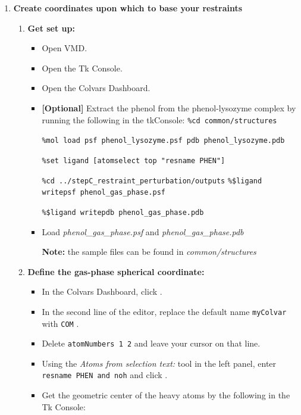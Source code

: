 \documentclass[9pt,tutorial]{Styling/livecoms}
\newcommand{\tkconsole}[1]{\texttt{\%#1}}
\newcommand{\filepath}[1]{\textit{#1}}
\newcommand{\button}[1]{
  \inlineBox[gray]{\texttt{#1}}
}
\newcommand{\menu}[1]{
  \textit{#1}
}
\newcommand{\textInput}[1]{
  \texttt{#1}
}
\begin{document}
    \begin{enumerate}[label=\arabic*.]
    
        \item \textbf{Create coordinates upon which to base your restraints}
        \begin{enumerate}[label=\alph*., ref=\theenumi.\alph*]
            \item \textbf{Get set up:}
            \begin{itemize}
                \item Open VMD.
                \item Open the Tk Console.
                \item Open the Colvars Dashboard.
                
            \item \textbf{[Optional]} Extract the phenol from the phenol-lysozyme complex by running the following in the tkConsole:
                \tkconsole{cd common/structures}
                
                \tkconsole{mol load psf phenol\_lysozyme.psf pdb phenol\_lysozyme.pdb}
                
                \tkconsole{set ligand [atomselect top "resname PHEN"]}
                
                \tkconsole{cd ../stepC\_restraint\_perturbation/outputs}
                \tkconsole{\$ligand writepsf phenol\_gas\_phase.psf}
                
                \tkconsole{\$ligand writepdb phenol\_gas\_phase.pdb}

                \item Load \filepath{phenol\_gas\_phase.psf} and \filepath{phenol\_gas\_phase.pdb}
                
                \textbf{Note:} the sample files can be found in \filepath{common/structures}
                
                \end{itemize}

            \item \textbf{Define the gas-phase spherical coordinate:} \label{step:defineGasRestraints}
            \begin{itemize}
                \item In the Colvars Dashboard, click \button{New [Ctrl-n]}.
                \item In the second line of the editor, replace the default name \textInput{myColvar} with \textInput{COM}.
                \item Delete \textInput{atomNumbers 1 2} and leave your cursor on that line.
                \item Using the \menu{Atoms from selection text:} tool in the left panel, enter \textInput{resname PHEN and noh} and click \button{Insert [Enter]}.
                \item Get the geometric center of the heavy atoms by  the following in the Tk Console:
                

\end{itemize}
\end{enumerate}
\end{enumerate}
\end{document}
